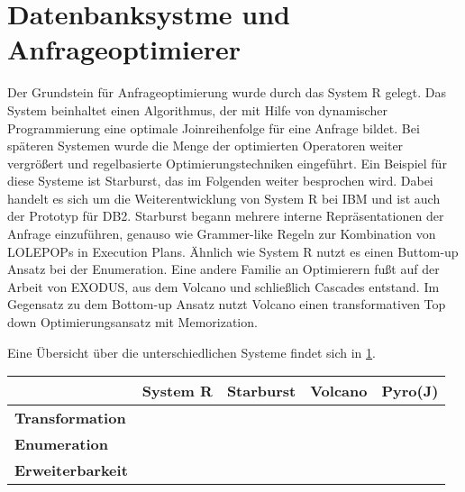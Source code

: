 








\section{Datenbanksystme und Anfrageoptimierer}

Der Grundstein für Anfrageoptimierung wurde durch das System R gelegt. Das System beinhaltet einen Algorithmus, der mit Hilfe von dynamischer Programmierung eine optimale Joinreihenfolge für eine Anfrage bildet. Bei späteren Systemen  wurde die Menge der optimierten Operatoren weiter vergrößert und regelbasierte Optimierungstechniken eingeführt. Ein Beispiel für diese Systeme ist Starburst, das im Folgenden weiter besprochen wird. Dabei handelt es sich um die Weiterentwicklung von System R bei IBM und ist  auch der Prototyp für DB2. Starburst begann mehrere interne Repräsentationen der Anfrage einzuführen, genauso wie Grammer-like Regeln zur Kombination von LOLEPOPs in Execution Plans. Ähnlich wie System R nutzt es einen Buttom-up Ansatz bei der Enumeration. Eine andere Familie an Optimierern fußt auf der Arbeit von  EXODUS, aus dem Volcano und schließlich Cascades entstand. Im Gegensatz zu dem Bottom-up Ansatz nutzt Volcano einen transformativen Top down Optimierungsansatz mit Memorization.




Eine Übersicht über die unterschiedlichen Systeme findet sich in \ref{DatabasesOverview}.

\begin{table}[h]
\begin{tabular}{|l|l|l|l|l|}
\hline
{\bf }                & {\bf System R} & {\bf Starburst} & {\bf Volcano} & {\bf Pyro(J)} \\ \hline
{\bf Transformation}  &                &                 &               &               \\ \hline
{\bf Enumeration}     &                &                 &               &               \\ \hline
{\bf Erweiterbarkeit} &                &                 &               &               \\ \hline
\end{tabular}
\label{DatabasesOverview}
\end{table}








